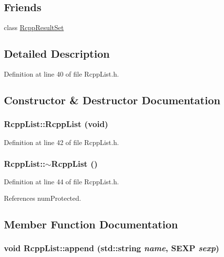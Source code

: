 \subsection*{Friends}
\begin{DoxyCompactItemize}
\item 
class \hyperlink{classRcppList_a36944d83d40784eedc607fbb24a5e993}{RcppResultSet}
\end{DoxyCompactItemize}


\subsection{Detailed Description}


Definition at line 40 of file RcppList.h.

\subsection{Constructor \& Destructor Documentation}
\hypertarget{classRcppList_a833e37533d546d5855536a331f398fe9}{
\subsubsection[{RcppList}]{\setlength{\rightskip}{0pt plus 5cm}RcppList::RcppList (void)}}
\label{classRcppList_a833e37533d546d5855536a331f398fe9}


Definition at line 42 of file RcppList.h.\hypertarget{classRcppList_ad73b9a2282219d7b8501ce7d3841bffa}{
\subsubsection[{$\sim$RcppList}]{\setlength{\rightskip}{0pt plus 5cm}RcppList::$\sim$RcppList ()}}
\label{classRcppList_ad73b9a2282219d7b8501ce7d3841bffa}


Definition at line 44 of file RcppList.h.

References numProtected.

\subsection{Member Function Documentation}
\hypertarget{classRcppList_a01cb90a1561ce26bfbfb77b7d1f43a22}{
\subsubsection[{append}]{\setlength{\rightskip}{0pt plus 5cm}void RcppList::append (std::string {\em name}, \/  SEXP {\em sexp})}}
\label{classRcppList_a01cb90a1561ce26bfbfb77b7d1f43a22}


